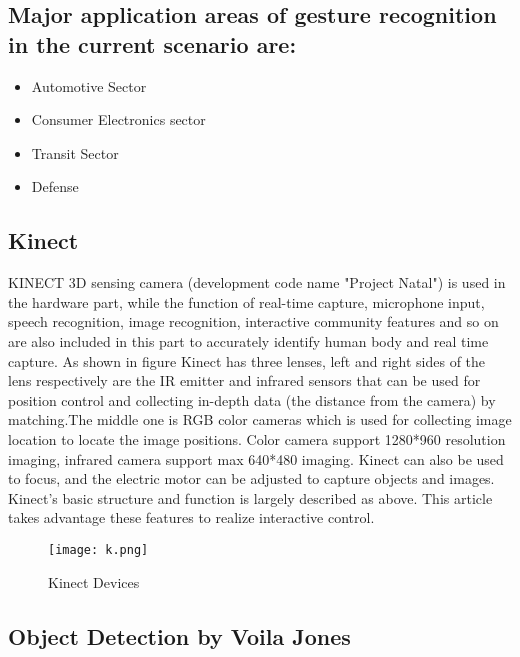 \documentclass[12pt,a4paper]{article}
\begin{document}
\subsection{Major application areas of gesture recognition in the current scenario are:}
\begin{itemize}
\item Automotive Sector
\item Consumer Electronics sector
\item Transit Sector
\item Defense
\end{itemize}
\newpage
\begin{center}
\section{Kinect}
\end{center}

KINECT
3D
sensing
camera
(development code name "Project Natal") is
used in the hardware part, while the function
of real-time capture, microphone input, speech
recognition, image recognition, interactive
community features and so on are also
included in this part to accurately identify
human body and real time capture. As shown
in figure Kinect has three lenses, left and right
sides of the lens respectively are the IR
emitter and infrared sensors that can be used
for position control and collecting in-depth
data (the distance from the camera) by
matching.The middle one is RGB color
cameras which is used for collecting image
location to locate the image positions. Color
camera support 1280*960 resolution imaging,
infrared camera support max 640*480
imaging. Kinect can also be used to focus, and
the electric motor can be adjusted to capture
objects and images. Kinect’s basic structure
and function is largely described as above.
This article takes advantage these features to
realize interactive control.
\par

\begin{figure}[h]
	\centering
	\texttt{[image: k.png]}
	\caption{Kinect Devices}
\end{figure}

\newpage
\begin{center}
\section{Object Detection by Voila Jones}
\end{center}
\end{document}
